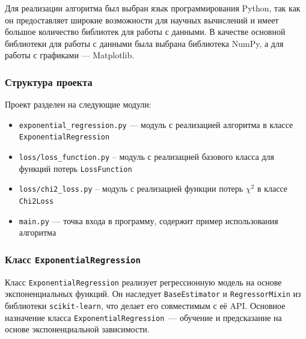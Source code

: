 Для реализации алгоритма был выбран язык программирования Python, так как он предоставляет широкие возможности для научных вычислений и имеет большое количество библиотек для работы с данными. В качестве основной библиотеки для работы с данными была выбрана библиотека NumPy, а для работы с графиками — Matplotlib.

\subsubsection{Структура проекта}

Проект разделен на следующие модули:

\begin{itemize}
	\item \texttt{exponential\_regression.py} — модуль с реализацией алгоритма в классе \texttt{ExponentialRegression}
	\item \texttt{loss/loss\_function.py} -- модуль с реализацией базового класса для функций потерь \texttt{LossFunction}
	\item \texttt{loss/chi2\_loss.py} -- модуль с реализацией функции потерь $\chi^2$ в классе \texttt{Chi2Loss}
	\item \texttt{main.py} — точка входа в программу, содержит пример использования алгоритма
\end{itemize}

\subsubsection{Класс \texttt{ExponentialRegression}}

Класс \texttt{ExponentialRegression} реализует регрессионную модель на основе экспоненциальных функций. Он наследует \texttt{BaseEstimator} и \texttt{RegressorMixin} из библиотеки \texttt{scikit-learn}, что делает его совместимым с её API. Основное назначение класса \texttt{ExponentialRegression}~--- обучение и предсказание на основе экспоненциальной зависимости.

